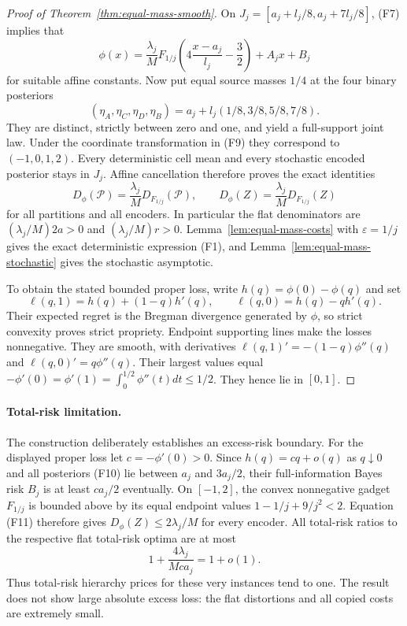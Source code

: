 \begin{proof}[Proof of Theorem~\ref{thm:equal-mass-smooth}]
On $J_j=[a_j+l_j/8,a_j+7l_j/8]$, (F7) implies that
\[
 \phi(x)=\frac{\lambda_j}{M}
  F_{1/j}\left(4\frac{x-a_j}{l_j}-\frac32\right)+A_jx+B_j
 \tag{F9}\label{eq:equal-local-identity}
\]
for suitable affine constants.  Now put equal source masses $1/4$
at the four binary posteriors
\[
 (\eta_A,\eta_C,\eta_D,\eta_B)
 =a_j+l_j(1/8,3/8,5/8,7/8).
 \tag{F10}\label{eq:equal-posteriors}
\]
They are distinct, strictly between zero and one, and yield a full-support
joint law.  Under the coordinate transformation in (F9) they correspond
to $(-1,0,1,2)$.  Every deterministic cell mean and every stochastic
encoded posterior stays in $J_j$.  Affine cancellation therefore proves
the exact identities
\[
 D_\phi(\mathcal P)=\frac{\lambda_j}{M}D_{F_{1/j}}(\mathcal P),
 \qquad D_\phi(Z)=\frac{\lambda_j}{M}D_{F_{1/j}}(Z)
 \tag{F11}\label{eq:equal-all-encoder-identity}
\]
for all partitions and all encoders.  In particular the flat denominators
are $(\lambda_j/M)2a>0$ and $(\lambda_j/M)r>0$.
Lemma~\ref{lem:equal-mass-costs} with $\varepsilon=1/j$ gives the
exact deterministic expression (F1), and
Lemma~\ref{lem:equal-mass-stochastic} gives the stochastic asymptotic.

To obtain the stated bounded proper loss, write
$h(q)=\phi(0)-\phi(q)$ and set
\[
 \ell(q,1)=h(q)+(1-q)h'(q),\qquad
 \ell(q,0)=h(q)-qh'(q).
\]
Their expected regret is the Bregman divergence generated by $\phi$,
so strict convexity proves strict propriety.  Endpoint supporting lines
make the losses nonnegative.  They are smooth, with derivatives
$\ell(q,1)'=-(1-q)\phi''(q)$ and
$\ell(q,0)'=q\phi''(q)$.  Their largest values equal
$-\phi'(0)=\phi'(1)=\int_0^{1/2}\phi''(t)dt\leq1/2$.
They hence lie in $[0,1]$.
\end{proof}

\paragraph{Total-risk limitation.}
The construction deliberately establishes an excess-risk boundary.
For the displayed proper loss let $c=-\phi'(0)>0$.  Since
$h(q)=cq+o(q)$ as $q\downarrow0$ and all posteriors (F10) lie between
$a_j$ and $3a_j/2$, their full-information Bayes risk $B_j$ is at least
$ca_j/2$ eventually.  On $[-1,2]$, the convex nonnegative gadget
$F_{1/j}$ is bounded above by its equal endpoint values
$1-1/j+9/j^2<2$.  Equation (F11) therefore gives
$D_\phi(Z)\leq2\lambda_j/M$ for every encoder.  All total-risk ratios
to the respective flat total-risk optima are at most
\[
 1+\frac{4\lambda_j}{Mca_j}=1+o(1).
\]
Thus total-risk hierarchy prices for these very instances tend to one.
The result does not show large absolute excess loss: the flat distortions
and all copied costs are extremely small.

